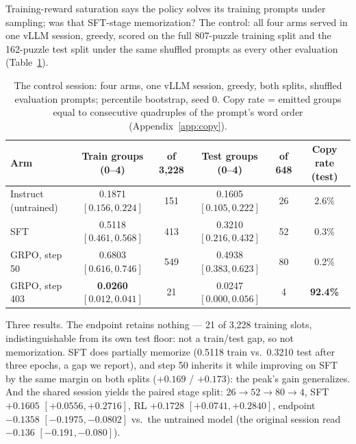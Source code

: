 \documentclass{article}
\begin{document}
Training-reward saturation says the policy solves its training prompts
under sampling; was that SFT-stage memorization? The control: all four arms
served in one vLLM session, greedy, scored on the full 807-puzzle training
split and the 162-puzzle test split under the same shuffled prompts as
every other evaluation (Table~\ref{tab:control}).

\begin{table}[t]
\centering
\caption{The control session: four arms, one vLLM session, greedy, both
splits, shuffled evaluation prompts; percentile bootstrap, seed 0. Copy
rate = emitted groups equal to consecutive quadruples of the prompt's word
order (Appendix~\ref{app:copy}).}
\label{tab:control}
\footnotesize
\setlength{\tabcolsep}{4pt}
\begin{tabular}{lccccc}
\toprule
Arm & Train groups (0--4) & of 3{,}228 & Test groups (0--4) & of 648 & Copy rate (test) \\
\midrule
Instruct (untrained) & 0.1871 $[0.156, 0.224]$ & 151 & 0.1605 $[0.105, 0.222]$ & 26 & 2.6\% \\
SFT & 0.5118 $[0.461, 0.568]$ & 413 & 0.3210 $[0.216, 0.432]$ & 52 & 0.3\% \\
GRPO, step 50 & 0.6803 $[0.616, 0.746]$ & 549 & 0.4938 $[0.383, 0.623]$ & 80 & 0.2\% \\
GRPO, step 403 & \textbf{0.0260} $[0.012, 0.041]$ & 21 & 0.0247 $[0.000, 0.056]$ & 4 & \textbf{92.4\%} \\
\bottomrule
\end{tabular}
\end{table}

Three results. The endpoint retains nothing --- 21 of 3{,}228 training
slots, indistinguishable from its own test floor: not a train/test gap, so
not memorization. SFT does partially memorize (0.5118 train vs.\ 0.3210
test after three epochs, a gap we report), and step 50 inherits it while
improving on SFT by the same margin on both splits ($+0.169$ / $+0.173$):
the peak's gain generalizes. And the shared session yields the
paired stage split: $26 \rightarrow 52 \rightarrow 80 \rightarrow 4$, SFT $+0.1605$ $[+0.0556, +0.2716]$, RL $+0.1728$
$[+0.0741, +0.2840]$, endpoint $-0.1358$ $[-0.1975, -0.0802]$ vs.\ the
untrained model (the original session read $-0.136$ $[-0.191, -0.080]$).
\end{document}

